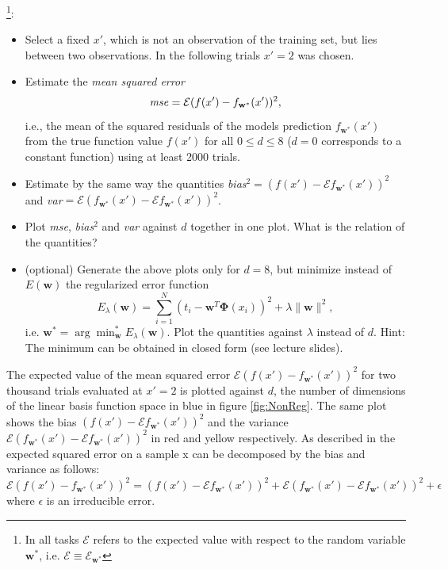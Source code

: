 \documentclass[a4]{article}
\begin{document}
\vspace{2mm}
\footnote{In all tasks $\mathcal{E}$ refers to the expected value with respect to the random variable ${\mathbf w^*}$, i.e. $\mathcal{E} \equiv \mathcal{E}_{\mathbf w^*}$}:
\begin{itemize}
\item Select a fixed $x'$, which is not an observation of the training set, but lies between two observations. In the following trials $x' = 2$ was chosen.
\item Estimate the \emph{mean squared error} 
\begin{equation} \nonumber
\mbox{\emph{mse}} = \mathcal{E} (f(x')-f_{\mathbf w^*}(x'))^2,
\end{equation}i.e., the mean of the squared residuals of the models prediction $f_{\mathbf w^*}(x')$ from the true function value $f(x')$ for all $0 \leq d \leq 8$ ($d = 0$ corresponds to a constant function) using at least 2000 trials.  
\item Estimate by the same way the quantities \emph{bias}$^2 = (f(x')-\mathcal{E} f_{\mathbf w^*}(x'))^2$ and \emph{var}$ =\mathcal{E} (f_{\mathbf w^*}(x') - \mathcal{E} f_{\mathbf w^*}(x'))^2$.
\item Plot \emph{mse}, \emph{bias}$^2$ and \emph{var} against $d$ together in one plot. What is the relation of the quantities?
\item (optional) Generate the above plots only for $d=8$, but minimize instead of $E({\mathbf w})$ the regularized error function 
\begin{equation}
E_{\lambda}({\mathbf w}) = \sum_{i = 1}^N(t_i - {\mathbf w}^T{\mathbf \Phi}(x_i))^2 + \lambda \|{\mathbf w}\|^2,
\end{equation} 
i.e. ${\mathbf w}^* = \arg\min_{\mathbf w}^* E_{\lambda}({\mathbf w})$. Plot the quantities against $\lambda$ instead of $d$. Hint: The minimum can be obtained in closed form (see lecture slides). 
\end{itemize}


The expected value of the mean squared error $\mathcal{E} (f(x')-f_{\mathbf w^*}(x'))^2$ for two thousand trials evaluated at $x'=2$ is plotted against $d$, the number of dimensions of the linear basis function space in blue in figure \ref{fig:NonReg}. The same plot shows the bias $ (f(x')-\mathcal{E} f_{\mathbf w^*}(x'))^2$ and the variance $\mathcal{E} (f_{\mathbf w^*}(x') - \mathcal{E} f_{\mathbf w^*}(x'))^2$ in red and yellow respectively.
As described in \cite{hastie} the expected squared error on a sample x can be decomposed by the bias and variance as follows:
$$\mathcal{E} (f(x')-f_{\mathbf w^*}(x'))^2=(f(x')-\mathcal{E} f_{\mathbf w^*}(x'))^2+\mathcal{E} (f_{\mathbf w^*}(x') - \mathcal{E} f_{\mathbf w^*}(x'))^2 +\epsilon$$
where $\epsilon$ is an irreducible error.\\
\end{document}
